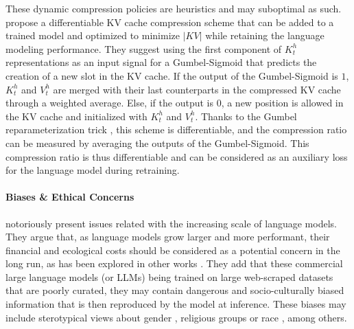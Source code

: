 These dynamic compression policies \citep{shi2024costdownreviewmethods} are heuristics and may suboptimal as such. \citet{nawrot2024dynamic} propose a differentiable KV cache compression scheme that can be added to a trained model and optimized to minimize $|KV|$ while retaining the language modeling performance. They suggest using the first component of $K^h_t$ representations as an input signal for a Gumbel-Sigmoid that predicts the creation of a new slot in the KV cache. If the output of the Gumbel-Sigmoid is $1$, $K^h_t$ and $V^h_t$ are merged with their last counterparts in the compressed KV cache through a weighted average. Else, if the output is $0$, a new position is allowed in the KV cache and initialized with $K^h_t$ and $V^h_t$. Thanks to the Gumbel reparameterization trick \citep{gumbel-orig}, this scheme is differentiable, and the compression ratio can be measured by averaging the outputs of the Gumbel-Sigmoid. This compression ratio is thus differentiable and can be considered as an auxiliary loss for the language model during retraining.




\paragraph*{Biases \& Ethical Concerns}

\citet{parrots_bender} notoriously present issues related with the increasing scale of language models. They argue that, as language models grow larger and more performant, their financial and ecological costs should be considered as a potential concern in the long run, as has been explored in other works \citep{su14095172, rillig_2023}. They add that these commercial large language models (or LLMs) being trained on large web-scraped datasets that are poorly curated, they may contain dangerous and socio-culturally biased information that is then reproduced by the model at inference. These biases may include sterotypical views about gender \citep{kotek2023gender}, religious groups \citep{10.1145/3461702.3462624} or race \citep{nadeem-etal-2021-stereoset}, among others.

\newpage



